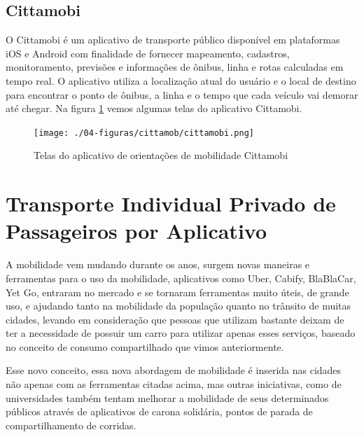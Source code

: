 
\subsection{Cittamobi}
O Cittamobi é um aplicativo de transporte público disponível em plataformas iOS e Android com finalidade de fornecer mapeamento, cadastros, monitoramento, previsões e informações de ônibus, linha e rotas calculadas em tempo real. O aplicativo utiliza a localização atual do usuário e o local de destino para encontrar o ponto de ônibus, a linha e o tempo que cada veículo vai demorar até chegar. Na figura \ref{fig:cittamobi} vemos algumas telas do aplicativo Cittamobi.

\begin{figure}[!hbtp]
	\centering
	\caption{Telas do aplicativo de orientações de mobilidade Cittamobi}
	\texttt{[image: ./04-figuras/cittamob/cittamobi.png]}
	\label{fig:cittamobi}
\end{figure}




\section{Transporte Individual Privado de Passageiros por Aplicativo}

A mobilidade vem mudando durante os anos, surgem novas maneiras e ferramentas para o uso da mobilidade, aplicativos como Uber, Cabify, BlaBlaCar, Yet Go, entraram no mercado e se tornaram ferramentas muito úteis, de grande uso, e ajudando tanto na mobilidade da população quanto no trânsito de muitas cidades, levando em consideração que pessoas que utilizam bastante deixam de ter a necessidade de possuir um carro para utilizar apenas esses serviços, baseado no conceito de consumo compartilhado que vimos anteriormente.

Esse novo conceito, essa nova abordagem de mobilidade é inserida nas cidades não apenas com as ferramentas citadas acima, mas outras iniciativas, como de universidades também tentam melhorar a mobilidade de seus determinados públicos através de aplicativos de carona solidária, pontos de parada de compartilhamento de corridas.

